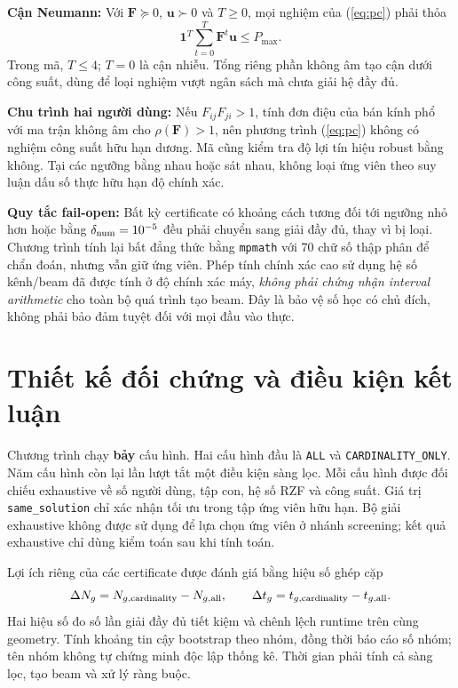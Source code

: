 \documentclass[onecolumn,11pt]{IEEEtran}
\begin{document}
\textbf{Cận Neumann:} Với $\mathbf F\succeq0$, $\mathbf u\succ0$ và $T\geq0$, mọi nghiệm của (\ref{eq:pc}) phải thỏa
\begin{equation}
\mathbf 1^T\sum_{t=0}^{T}\mathbf F^t\mathbf u\leq P_{\max}.\label{eq:neumann}
\end{equation}
Trong mã, $T\leq4$; $T=0$ là cận nhiễu. Tổng riêng phần không âm tạo cận dưới công suất, dùng để loại nghiệm vượt ngân sách mà chưa giải hệ đầy đủ.

\textbf{Chu trình hai người dùng:} Nếu $F_{ij}F_{ji}>1$, tính đơn điệu của bán kính phổ với ma trận không âm cho $\rho(\mathbf F)>1$, nên phương trình (\ref{eq:pc}) không có nghiệm công suất hữu hạn dương. Mã cũng kiểm tra độ lợi tín hiệu robust bằng không. Tại các ngưỡng bằng nhau hoặc sát nhau, không loại ứng viên theo suy luận dấu số thực hữu hạn độ chính xác.

\textbf{Quy tắc fail-open:} Bất kỳ certificate có khoảng cách tương đối tới ngưỡng nhỏ hơn hoặc bằng $\delta_{\rm num}=10^{-5}$ đều phải chuyển sang giải đầy đủ, thay vì bị loại. Chương trình tính lại bất đẳng thức bằng \texttt{mpmath} với 70 chữ số thập phân để chẩn đoán, nhưng vẫn giữ ứng viên. Phép tính chính xác cao sử dụng hệ số kênh/beam đã được tính ở độ chính xác máy, \emph{không phải chứng nhận interval arithmetic} cho toàn bộ quá trình tạo beam. Đây là bảo vệ số học có chủ đích, không phải bảo đảm tuyệt đối với mọi đầu vào thực.

\section{Thiết kế đối chứng và điều kiện kết luận}
Chương trình chạy \textbf{bảy} cấu hình. Hai cấu hình đầu là \texttt{ALL} và \texttt{CARDINALITY\_ONLY}. Năm cấu hình còn lại lần lượt tắt một điều kiện sàng lọc. Mỗi cấu hình được đối chiếu exhaustive về số người dùng, tập con, hệ số RZF và công suất. Giá trị \texttt{same\_solution} chỉ xác nhận tối ưu trong tập ứng viên hữu hạn. Bộ giải exhaustive không được sử dụng để lựa chọn ứng viên ở nhánh screening; kết quả exhaustive chỉ dùng kiểm toán sau khi tính toán.

Lợi ích riêng của các certificate được đánh giá bằng hiệu số ghép cặp
\begin{equation}
\Delta N_g=N_{g,\rm cardinality}-N_{g,\rm all},\qquad
\Delta t_g=t_{g,\rm cardinality}-t_{g,\rm all}.
\end{equation}
Hai hiệu số đo số lần giải đầy đủ tiết kiệm và chênh lệch runtime trên cùng geometry. Tính khoảng tin cậy bootstrap theo nhóm, đồng thời báo cáo số nhóm; tên nhóm không tự chứng minh độc lập thống kê. Thời gian phải tính cả sàng lọc, tạo beam và xử lý ràng buộc.
\end{document}
